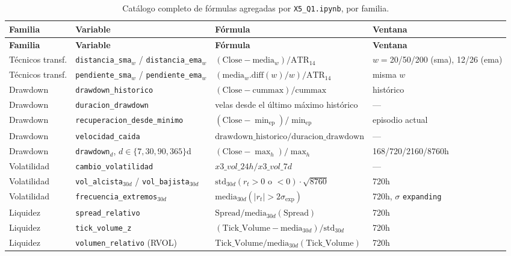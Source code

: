 \documentclass[11pt,a4paper]{article}
\newcommand{\code}[1]{\texttt{\small #1}}
\begin{document}
\begin{longtable}{@{}p{2.3cm} p{3.4cm} p{7.0cm} p{2.0cm}@{}}
\caption{Catálogo completo de fórmulas agregadas por \code{X5\_Q1.ipynb}, por familia.}
\\
\toprule
\textbf{Familia} & \textbf{Variable} & \textbf{Fórmula} & \textbf{Ventana} \\
\midrule
\endfirsthead
\toprule
\textbf{Familia} & \textbf{Variable} & \textbf{Fórmula} & \textbf{Ventana} \\
\midrule
\endhead
\bottomrule
\endfoot
Técnicos transf. & \code{distancia\_sma}\(_w\) / \code{distancia\_ema}\(_w\) &
  \((\text{Close}-\text{media}_w)/\text{ATR}_{14}\) & \(w{=}\)20/50/200 (sma),
  12/26 (ema) \\
Técnicos transf. & \code{pendiente\_sma}\(_w\) / \code{pendiente\_ema}\(_w\) &
  \((\text{media}_w.\mathrm{diff}(w)/w)/\text{ATR}_{14}\) & misma \(w\) \\
Drawdown & \code{drawdown\_historico} &
  \((\text{Close}-\mathrm{cummax})/\mathrm{cummax}\) & histórico \\
Drawdown & \code{duracion\_drawdown} & velas desde el último máximo histórico & — \\
Drawdown & \code{recuperacion\_desde\_minimo} &
  \((\text{Close}-\min_{\mathrm{ep}})/\min_{\mathrm{ep}}\) & episodio actual \\
Drawdown & \code{velocidad\_caida} &
  \(\text{drawdown\_historico}/\text{duracion\_drawdown}\) & — \\
Drawdown & \code{drawdown}\(_d\), \(d{\in}\{7,30,90,365\}\)d &
  \((\text{Close}-\max_h)/\max_h\) & 168/720/2160/8760h \\
Volatilidad & \code{cambio\_volatilidad} & \(x3\_vol\_24h / x3\_vol\_7d\) & — \\
Volatilidad & \code{vol\_alcista}\(_{30d}\) / \code{vol\_bajista}\(_{30d}\) &
  \(\mathrm{std}_{30d}(r_t{>}0\text{ o }{<}0)\cdot\sqrt{8760}\) & 720h \\
Volatilidad & \code{frecuencia\_extremos}\(_{30d}\) &
  \(\mathrm{media}_{30d}(|r_t|{>}2\sigma_{\mathrm{exp}})\) & 720h,
  \(\sigma\) \texttt{expanding} \\
Liquidez & \code{spread\_relativo} &
  \(\text{Spread}/\mathrm{media}_{30d}(\text{Spread})\) & 720h \\
Liquidez & \code{tick\_volume\_z} &
  \((\text{Tick\_Volume}-\mathrm{media}_{30d})/\mathrm{std}_{30d}\) & 720h \\
Liquidez & \code{volumen\_relativo} (RVOL) &
  \(\text{Tick\_Volume}/\mathrm{media}_{30d}(\text{Tick\_Volume})\) & 720h \\

\end{longtable}
\end{document}
